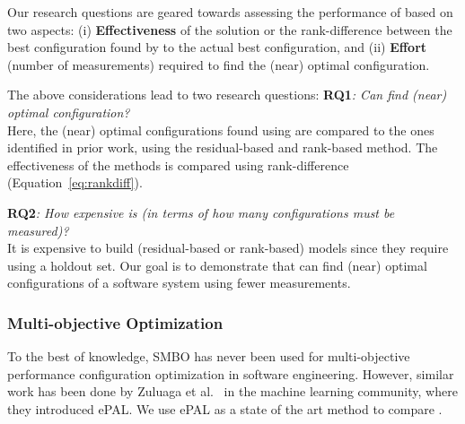 Our research questions are geared towards assessing the performance of \flash based on two aspects: (i) \textbf{Effectiveness} of the solution or the rank-difference between the best configuration found by \flash to the actual best configuration, and (ii) \textbf{Effort} (number of measurements) required to find the (near) optimal configuration.

\noindent The above considerations lead to two research questions:
\noindent\textbf{RQ1}\textit{: Can  \flash find (near) optimal configuration?}\\
Here, the (near) optimal configurations found using \flash are compared to the ones identified in prior work, using the residual-based and rank-based method. The effectiveness of the methods is compared using rank-difference (Equation~\ref{eq:rankdiff}). 


\noindent\textbf{RQ2}\textit{: How expensive is \flash (in terms of
 how many configurations must be measured)?}\\
It is expensive to build (residual-based or rank-based) models since they require using a holdout set. Our goal is to  demonstrate that \flash can find (near) optimal configurations of a software system using fewer measurements.

\subsubsection{Multi-objective Optimization}
To the best of knowledge, SMBO has never been used for multi-objective performance configuration optimization in software engineering. However, similar work has been done by Zuluaga et al.~\cite{zuluaga2016varepsilon} in the machine learning community, where they introduced ePAL. We use ePAL as a state of the art method to compare \flash.

